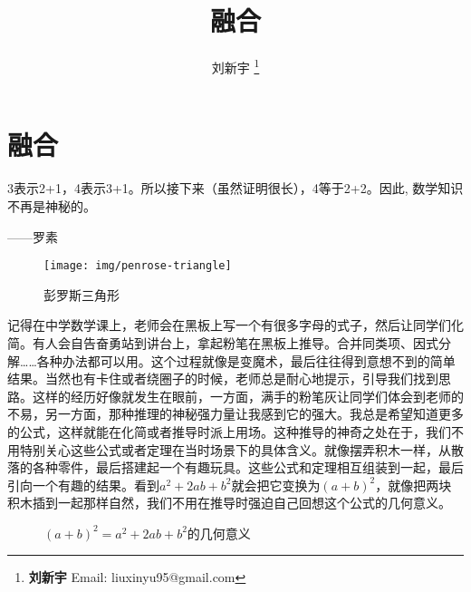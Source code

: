 \documentclass[b5paper]{ctexart}
\begin{document}
\title{融合}

\author{刘新宇
\thanks{{\bfseries 刘新宇} \newline
  Email: liuxinyu95@gmail.com \newline}
  }

\maketitle
\fi


\ifx\wholebook\relax
\chapter{融合}
\fi

\epigraph{3表示2+1，4表示3+1。所以接下来（虽然证明很长），4等于2+2。因此, 数学知识不再是神秘的。}{——罗素}


\begin{figure}[htbp]
 \centering
 \texttt{[image: img/penrose-triangle]}
 \captionsetup{labelformat=empty}
 \caption{彭罗斯三角形}
 \label{fig:Penrose-triangle}
\end{figure}

记得在中学数学课上，老师会在黑板上写一个有很多字母的式子，然后让同学们化简。有人会自告奋勇站到讲台上，拿起粉笔在黑板上推导。合并同类项、因式分解……各种办法都可以用。这个过程就像是变魔术，最后往往得到意想不到的简单结果。当然也有卡住或者绕圈子的时候，老师总是耐心地提示，引导我们找到思路。这样的经历好像就发生在眼前，一方面，满手的粉笔灰让同学们体会到老师的不易，另一方面，那种推理的神秘强力量让我感到它的强大。我总是希望知道更多的公式，这样就能在化简或者推导时派上用场。这种推导的神奇之处在于，我们不用特别关心这些公式或者定理在当时场景下的具体含义。就像摆弄积木一样，从散落的各种零件，最后搭建起一个有趣玩具。这些公式和定理相互组装到一起，最后引向一个有趣的结果。看到$a^2 + 2ab + b^2$就会把它变换为$(a+b)^2$，就像把两块积木插到一起那样自然，我们不用在推导时强迫自己回想这个公式的几何意义。

\begin{figure}[htbp]
\centering
{}
\caption{$(a + b)^2 = a^2 + 2ab + b^2$的几何意义}
\end{figure}
\end{document}
